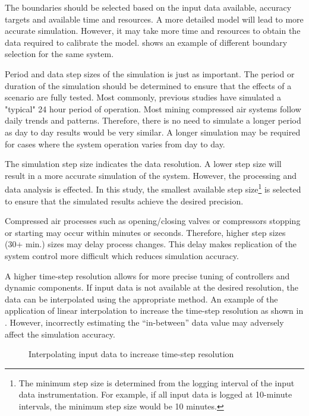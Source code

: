 	\par 
	The boundaries should be selected based on the input data available, accuracy targets and available time and resources. A more detailed model will lead to more accurate simulation. However, it may take more time and resources to obtain the data required to calibrate the model.  shows an example of different boundary selection for the same system.
	\par
	Period and data step sizes of the simulation is just as important. The period or duration of the simulation should be determined to ensure that the effects of a scenario are fully tested. Most commonly, previous studies have simulated a "typical" 24 hour period of operation. Most mining compressed air systems follow daily trends and patterns. Therefore, there is no need to simulate a longer period as day to day results would be very similar. A longer simulation may be required for cases where the system operation varies from day to day.
	\par 
	The simulation step size indicates the data resolution. A lower step size will result in a more accurate simulation of the system. However, the processing and data analysis is effected. In this study, the smallest available step size\footnote{The minimum step size is determined from the logging interval of the input data instrumentation. For example, if all input data is logged at 10-minute intervals, the minimum step size would be 10 minutes.} is selected to ensure that the simulated results achieve the desired precision. 
	\par 
	 Compressed air processes such as opening/closing valves or compressors stopping or starting may occur within minutes or seconds. Therefore, higher step sizes (30+ min.) sizes may delay process changes. This delay makes replication of the system control more difficult which reduces simulation accuracy.
	\par
	A higher time-step resolution allows for more precise tuning of controllers and dynamic components. If input data is not available at the desired resolution, the data can be interpolated using the appropriate method. An example of the application of linear interpolation to increase the time-step resolution as shown in . However, incorrectly estimating the \enquote{in-between}  data value may adversely affect the simulation accuracy.
	
	\begin{figure}[h]
		\centering
		\fbox{}
		\caption{Interpolating input data to increase time-step resolution}
		\label{fig: Inter}
	\end{figure}
